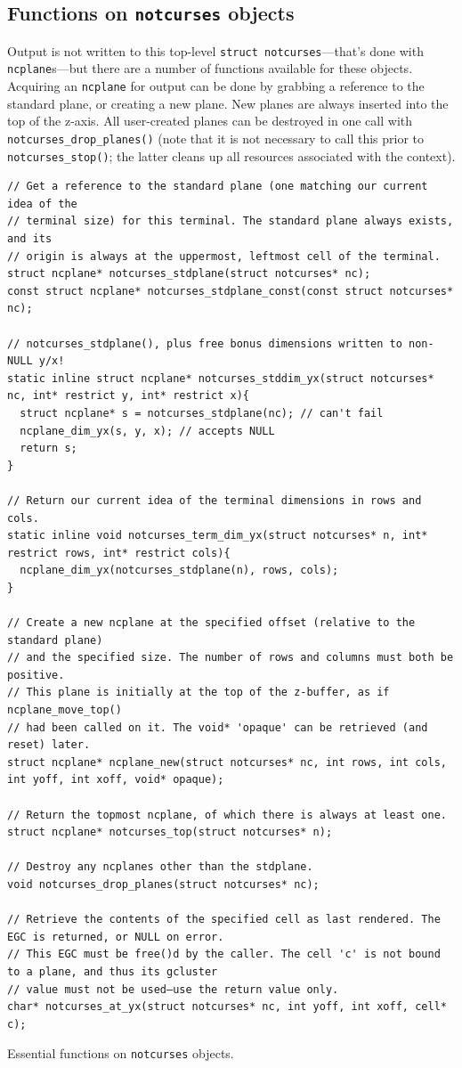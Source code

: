 \documentclass[letterpaper,10pt]{article}
\begin{document}
\subsection{Functions on \texttt{notcurses} objects}
\label{sec:notcursesfuncs}
Output is not written to this top-level \texttt{struct notcurses}---that's
done with \texttt{ncplane}s---but there are a number of functions
available for these objects. Acquiring an \texttt{ncplane} for output can be
done by grabbing a reference to the standard plane, or creating a new plane.
New planes are always inserted into the top of the z-axis. All user-created
planes can be destroyed in one call with \texttt{notcurses\_drop\_planes()} (note
that it is not necessary to call this prior to \texttt{notcurses\_stop()}; the
latter cleans up all resources associated with the context).

\begin{listing}[!htbp]
\begin{verbatim}
// Get a reference to the standard plane (one matching our current idea of the
// terminal size) for this terminal. The standard plane always exists, and its
// origin is always at the uppermost, leftmost cell of the terminal.
struct ncplane* notcurses_stdplane(struct notcurses* nc);
const struct ncplane* notcurses_stdplane_const(const struct notcurses* nc);

// notcurses_stdplane(), plus free bonus dimensions written to non-NULL y/x!
static inline struct ncplane* notcurses_stddim_yx(struct notcurses* nc, int* restrict y, int* restrict x){
  struct ncplane* s = notcurses_stdplane(nc); // can't fail
  ncplane_dim_yx(s, y, x); // accepts NULL
  return s;
}

// Return our current idea of the terminal dimensions in rows and cols.
static inline void notcurses_term_dim_yx(struct notcurses* n, int* restrict rows, int* restrict cols){
  ncplane_dim_yx(notcurses_stdplane(n), rows, cols);
}

// Create a new ncplane at the specified offset (relative to the standard plane)
// and the specified size. The number of rows and columns must both be positive.
// This plane is initially at the top of the z-buffer, as if ncplane_move_top()
// had been called on it. The void* 'opaque' can be retrieved (and reset) later.
struct ncplane* ncplane_new(struct notcurses* nc, int rows, int cols, int yoff, int xoff, void* opaque);

// Return the topmost ncplane, of which there is always at least one.
struct ncplane* notcurses_top(struct notcurses* n);

// Destroy any ncplanes other than the stdplane.
void notcurses_drop_planes(struct notcurses* nc);

// Retrieve the contents of the specified cell as last rendered. The EGC is returned, or NULL on error.
// This EGC must be free()d by the caller. The cell 'c' is not bound to a plane, and thus its gcluster
// value must not be used—use the return value only.
char* notcurses_at_yx(struct notcurses* nc, int yoff, int xoff, cell* c);
\end{verbatim}
\caption{Essential functions on \texttt{notcurses} objects.}
\end{listing}
\end{document}
